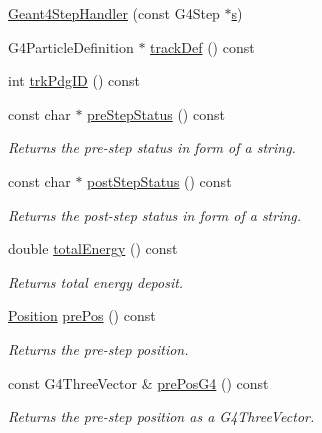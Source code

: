 \begin{DoxyCompactItemize}
\item 
\hyperlink{class_d_d4hep_1_1_simulation_1_1_geant4_step_handler_aa523240f8dd670751a61d26b02c4e0a7}{Geant4\+Step\+Handler} (const G4\+Step $\ast$\hyperlink{_volumes_8cpp_a17ca6bfc8040d695d3cada22a4763d40}{s})
\item 
G4\+Particle\+Definition $\ast$ \hyperlink{class_d_d4hep_1_1_simulation_1_1_geant4_step_handler_a989b3f079f3d153718d381d766bb2a58}{track\+Def} () const
\item 
int \hyperlink{class_d_d4hep_1_1_simulation_1_1_geant4_step_handler_a30aa9c15093a6ffef6402e1a41a1c82f}{trk\+Pdg\+ID} () const
\item 
const char $\ast$ \hyperlink{class_d_d4hep_1_1_simulation_1_1_geant4_step_handler_abbe2109ee72c4bd038db33c7f9b55bf1}{pre\+Step\+Status} () const
\begin{DoxyCompactList}\small\item\em Returns the pre-\/step status in form of a string. \end{DoxyCompactList}\item 
const char $\ast$ \hyperlink{class_d_d4hep_1_1_simulation_1_1_geant4_step_handler_a2e267e523aefa237ace0474ab22a7b87}{post\+Step\+Status} () const
\begin{DoxyCompactList}\small\item\em Returns the post-\/step status in form of a string. \end{DoxyCompactList}\item 
double \hyperlink{class_d_d4hep_1_1_simulation_1_1_geant4_step_handler_a1945532b5c538c979b75f598dd1f54d0}{total\+Energy} () const
\begin{DoxyCompactList}\small\item\em Returns total energy deposit. \end{DoxyCompactList}\item 
\hyperlink{namespace_d_d4hep_1_1_geometry_a55083902099d03506c6db01b80404900}{Position} \hyperlink{class_d_d4hep_1_1_simulation_1_1_geant4_step_handler_ad168390a8f6da55740c092686d2c9f84}{pre\+Pos} () const
\begin{DoxyCompactList}\small\item\em Returns the pre-\/step position. \end{DoxyCompactList}\item 
const G4\+Three\+Vector \& \hyperlink{class_d_d4hep_1_1_simulation_1_1_geant4_step_handler_a087079e78925eeaedf2e20c394c5c820}{pre\+Pos\+G4} () const
\begin{DoxyCompactList}\small\item\em Returns the pre-\/step position as a G4\+Three\+Vector. \end{DoxyCompactList}\item 

\end{DoxyCompactItemize}
